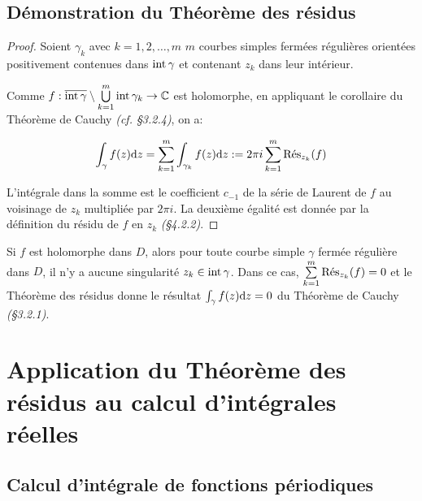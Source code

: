 \subsection{Démonstration du Théorème des résidus}

\begin{proof}
    Soient $\gamma_k$ avec $k = 1, 2, \ldots, m$ $m$ courbes simples fermées régulières orientées positivement contenues dans $\inte \gamma$ et contenant $z_k$ dans leur intérieur.
    
    Comme $f: \adh{\gamma} \setminus \bigcup\limits_{k = 1}^m \inte \gamma_k \rightarrow \Cx$ est holomorphe, en appliquant le corollaire du Théorème de Cauchy \textit{(cf. §3.2.4)}, on a:
    
    \[ \int_\gamma f(z) \dz = \sum_{k = 1}^m \int_{\gamma_k} f(z) \dz := 2\pi i \sum_{k = 1}^m \Res_{z_k}(f) \]
    
    L'intégrale dans la somme est le coefficient $c_{-1}$ de la série de Laurent de $f$ au voisinage de $z_k$ multipliée par $2\pi i$.
    La deuxième égalité est donnée par la définition du résidu de $f$ en $z_k$ \textit{(§4.2.2)}.
\end{proof}

\begin{remark}
    Si $f$ est holomorphe dans $D$, alors pour toute courbe simple $\gamma$ fermée régulière dans $D$, il n'y a aucune singularité $z_k \in \inte \gamma$.
    Dans ce cas, $\sum\limits_{k = 1}^m \Res_{z_k}(f) = 0$ et le Théorème des résidus donne le résultat $\int_\gamma f(z) \dz = 0$ du Théorème de Cauchy \textit{(§3.2.1)}.
\end{remark}


\section{Application du Théorème des résidus au calcul d'intégrales réelles}

\subsection{Calcul d'intégrale de fonctions périodiques}

